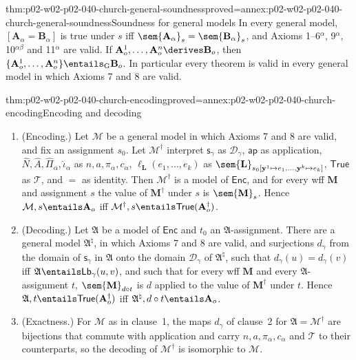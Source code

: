 \begin{hbtheorem}{thm:p02-w02-p02-040-church-general-soundness}{proved=annex:p02-w02-p02-040-church-general-soundness}{Soundness for general models}
In every general model, \([\mathbf A_\alpha=\mathbf B_\alpha]\) is true under
\(s\) iff \(\sem{\mathbf A_\alpha}_s=\sem{\mathbf B_\alpha}_s\), and Axioms
1--6\(^\alpha\), 9\(^\alpha\), 10\(^{\alpha\beta}\) and 11\(^\alpha\) are valid.  If
\(\mathbf A^1_o,\ldots,\mathbf A^n_o\derives\mathbf B_o\), then
\(\{\mathbf A^1_o,\ldots,\mathbf A^n_o\}\entails_{\mathrm G}\mathbf B_o\).  In
particular every theorem is valid in every general model in which Axioms 7
and 8 are valid.
\end{hbtheorem}

\begin{hbtheorem}{thm:p02-w02-p02-040-church-encoding}{proved=annex:p02-w02-p02-040-church-encoding}{Encoding and decoding}
\begin{enumerate}
 \item (Encoding.)  Let \(\mathcal M\) be a general model in which Axioms 7
   and 8 are valid, and fix an assignment \(s_0\).  Let \(\mathcal M^\dagger\)
   interpret \(\mathsf s_\gamma\) as \(\mathcal D_\gamma\), \(\mathsf{ap}\) as
   application, \(\widehat N,\widehat A,\widehat\Pi_\alpha,\widehat\iota_\alpha\) as
   \(n,a,\pi_\alpha,c_\alpha\), \(\ell_{\mathbf L}(e_1,\ldots,e_k)\) as
   \(\sem{\mathbf L}_{s_0[\mathbf y^1\mapsto e_1,\ldots,\mathbf y^k\mapsto e_k]}\),
   \(\mathsf{True}\) as \(\mathcal T\), and \(=\) as identity.  Then
   \(\mathcal M^\dagger\) is a model of \(\mathsf{Enc}\), and for every wff
   \(\mathbf M\) and assignment \(s\) the value of \(\mathbf M^\dagger\) under
   \(s\) is \(\sem{\mathbf M}_s\).  Hence
   \(\mathcal M,s\entails\mathbf A_o\) iff
   \(\mathcal M^\dagger,s\entails\mathsf{True}(\mathbf A_o^\dagger)\).
 \item (Decoding.)  Let \(\mathfrak A\) be a model of \(\mathsf{Enc}\) and
   \(t_0\) an \(\mathfrak A\)-assignment.  There are a general model
   \(\mathfrak A^\natural\), in which Axioms 7 and 8 are valid, and
   surjections \(d_\gamma\) from the domain of \(\mathsf s_\gamma\) in
   \(\mathfrak A\) onto the domain \(\mathcal D_\gamma\) of
   \(\mathfrak A^\natural\), such that \(d_\gamma(u)=d_\gamma(v)\) iff
   \(\mathfrak A\entails\mathsf{Lb}_\gamma(u,v)\), and such that for every wff
   \(\mathbf M\) and every \(\mathfrak A\)-assignment \(t\),
   \(\sem{\mathbf M}_{d\circ t}\) is \(d\) applied to the value of
   \(\mathbf M^\dagger\) under \(t\).  Hence
   \(\mathfrak A,t\entails\mathsf{True}(\mathbf A_o^\dagger)\) iff
   \(\mathfrak A^\natural,d\circ t\entails\mathbf A_o\).
 \item (Exactness.)  For \(\mathcal M\) as in clause~1, the maps
   \(d_\gamma\) of clause~2 for \(\mathfrak A=\mathcal M^\dagger\) are
   bijections that commute with application and carry \(n,a,\pi_\alpha,c_\alpha\)
   and \(\mathcal T\) to their counterparts, so the decoding of
   \(\mathcal M^\dagger\) is isomorphic to \(\mathcal M\).
\end{enumerate}
\end{hbtheorem}

